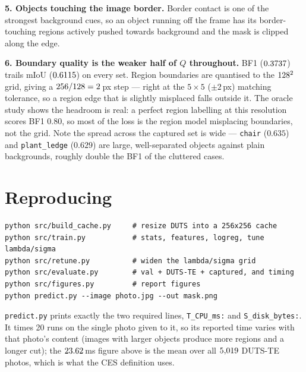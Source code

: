 \documentclass[11pt,a4paper]{article}
\begin{document}
\textbf{5. Objects touching the image border.} Border contact is one of the strongest
background cues, so an object running off the frame has its border-touching regions
actively pushed towards background and the mask is clipped along the edge.

\textbf{6. Boundary quality is the weaker half of $Q$ throughout.} BF1 ($0.3737$) trails
mIoU ($0.6115$) on every set. Region boundaries are quantised to the $128^2$ grid,
giving a $256/128=2$\,px step --- right at the $5\times5$ ($\pm2$\,px) matching
tolerance, so a region edge that is slightly misplaced falls outside it. The oracle study
shows the headroom is real: a perfect region labelling at this resolution scores BF1
$0.80$, so most of the loss is the region model misplacing boundaries, not the grid.
Note the spread across the captured set is wide --- \texttt{chair} ($0.635$) and
\texttt{plant\_ledge} ($0.629$) are large, well-separated objects against plain
backgrounds, roughly double the BF1 of the cluttered cases.

\section{Reproducing}
\begin{verbatim}
python src/build_cache.py     # resize DUTS into a 256x256 cache
python src/train.py           # stats, features, logreg, tune lambda/sigma
python src/retune.py          # widen the lambda/sigma grid
python src/evaluate.py        # val + DUTS-TE + captured, and timing
python src/figures.py         # report figures
python predict.py --image photo.jpg --out mask.png
\end{verbatim}

\noindent\texttt{predict.py} prints exactly the two required lines,
\texttt{T\_CPU\_ms:} and \texttt{S\_disk\_bytes:}. It times 20 runs on the single
photo given to it, so its reported time varies with that photo's content (images with
larger objects produce more regions and a longer cut); the $23.62$\,ms figure above is
the mean over all $5{,}019$ DUTS-TE photos, which is what the CES definition uses.
\end{document}
